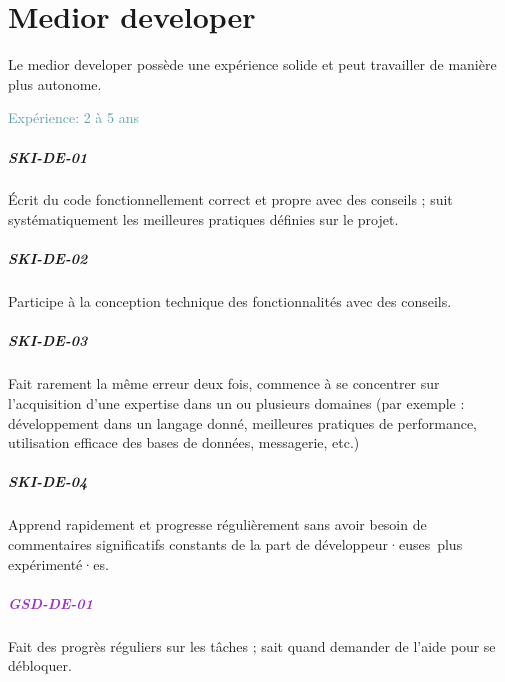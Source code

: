 \documentclass[a4paper, french, openany, 12pt]{book}
\newcommand\dex[1]{\textcolor{BrickRed}{\textbf{\uppercase{ski-{#1}}}}}
\newcommand\str[1]{\textcolor{DarkOrchid}{\textbf{\uppercase{gsd-{#1}}}}}
\newcommand\xp[1]{\textcolor{CadetBlue}{Expérience: {#1} ans}}
\newcommand\devs{développeur·euses}
\begin{document}
\chapter{Medior developer}

Le medior developer possède une expérience solide et peut travailler de manière plus autonome.

\xp{2 à 5}

\begin{multicols}{2}

  \paragraph*{\dex{de-01}}

  Écrit du code fonctionnellement correct et propre avec des conseils ; suit systématiquement les meilleures pratiques 
  définies sur le projet.

  \paragraph*{\dex{de-02}}

  Participe à la conception technique des fonctionnalités avec des conseils.

  \paragraph*{\dex{de-03}}

  Fait rarement la même erreur deux fois, commence à se concentrer sur l'acquisition d'une expertise dans un ou plusieurs 
  domaines (par exemple : développement dans un langage donné, meilleures pratiques de performance, utilisation efficace 
  des bases de données, messagerie, etc.)

  \paragraph*{\dex{de-04}}

  Apprend rapidement et progresse régulièrement sans avoir besoin de commentaires significatifs constants de la part 
  de \devs\ plus expérimenté·es.

  \paragraph*{\str{de-01}}

  Fait des progrès réguliers sur les tâches ; sait quand demander de l'aide pour se débloquer.


\end{multicols}
\end{document}
